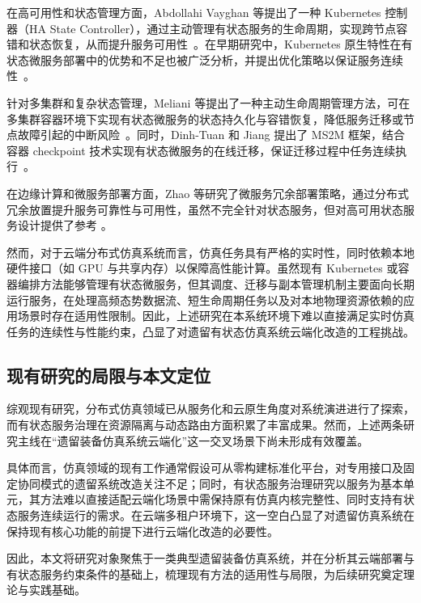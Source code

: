 \documentclass[lang=chs, degree=master, blindreview=true, winfonts=true, academic=false]{yanputhesis}
\begin{document}
在高可用性和状态管理方面，Abdollahi Vayghan 等提出了一种 Kubernetes 控制器（HA State Controller），通过主动管理有状态服务的生命周期，实现跨节点容错和状态恢复，从而提升服务可用性~\cite{Vayghan2021KubernetesStateful}。在早期研究中，Kubernetes 原生特性在有状态微服务部署中的优势和不足也被广泛分析，并提出优化策略以保证服务连续性~\cite{Vayghan2019HighAvailabilityK8s}。

针对多集群和复杂状态管理，Meliani 等提出了一种主动生命周期管理方法，可在多集群容器环境下实现有状态微服务的状态持久化与容错恢复，降低服务迁移或节点故障引起的中断风险~\cite{Meliani2025ResiliencyStateful}。同时，Dinh-Tuan 和 Jiang 提出了 MS2M 框架，结合容器 checkpoint 技术实现有状态微服务的在线迁移，保证迁移过程中任务连续执行~\cite{Dinh_Tuan_2025}。

在边缘计算和微服务部署方面，Zhao 等研究了微服务冗余部署策略，通过分布式冗余放置提升服务可靠性与可用性，虽然不完全针对状态服务，但对高可用状态服务设计提供了参考 \cite{Zhao2022DistributedRedundant}。

然而，对于云端分布式仿真系统而言，仿真任务具有严格的实时性，同时依赖本地硬件接口（如 GPU 与共享内存）以保障高性能计算。虽然现有 Kubernetes 或容器编排方法能够管理有状态微服务，但其调度、迁移与副本管理机制主要面向长期运行服务，在处理高频态势数据流、短生命周期任务以及对本地物理资源依赖的应用场景时存在适用性限制。因此，上述研究在本系统环境下难以直接满足实时仿真任务的连续性与性能约束，凸显了对遗留有状态仿真系统云端化改造的工程挑战。


\subsection{现有研究的局限与本文定位}

综观现有研究，分布式仿真领域已从服务化和云原生角度对系统演进进行了探索，而有状态服务治理在资源隔离与动态路由方面积累了丰富成果。然而，上述两条研究主线在“遗留装备仿真系统云端化”这一交叉场景下尚未形成有效覆盖。

具体而言，仿真领域的现有工作通常假设可从零构建标准化平台，对专用接口及固定协同模式的遗留系统改造关注不足；同时，有状态服务治理研究以服务为基本单元，其方法难以直接适配云端化场景中需保持原有仿真内核完整性、同时支持有状态服务连续运行的需求。在云端多租户环境下，这一空白凸显了对遗留仿真系统在保持现有核心功能的前提下进行云端化改造的必要性。

因此，本文将研究对象聚焦于一类典型遗留装备仿真系统，并在分析其云端部署与有状态服务约束条件的基础上，梳理现有方法的适用性与局限，为后续研究奠定理论与实践基础。
\end{document}

